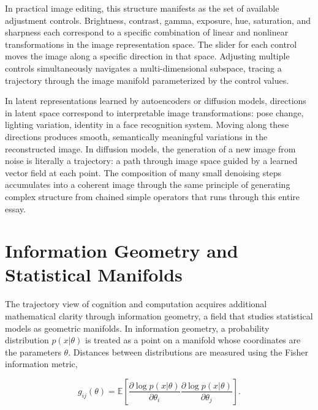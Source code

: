 \documentclass[11pt, a4paper]{article}
\theoremstyle{plain}
\theoremstyle{definition}
\theoremstyle{remark}
\begin{document}
In practical image editing, this structure manifests as the set of available adjustment
controls. Brightness, contrast, gamma, exposure, hue, saturation, and sharpness each
correspond to a specific combination of linear and nonlinear transformations in the image
representation space. The slider for each control moves the image along a specific
direction in that space. Adjusting multiple controls simultaneously navigates a
multi-dimensional subspace, tracing a trajectory through the image manifold parameterized
by the control values.

In latent representations learned by autoencoders or diffusion models, directions in
latent space correspond to interpretable image transformations: pose change, lighting
variation, identity in a face recognition system. Moving along these directions produces
smooth, semantically meaningful variations in the reconstructed image. In diffusion
models, the generation of a new image from noise is literally a trajectory: a path
through image space guided by a learned vector field at each point. The composition of
many small denoising steps accumulates into a coherent image through the same principle
of generating complex structure from chained simple operators that runs through this
entire essay.


\section{Information Geometry and Statistical Manifolds}

The trajectory view of cognition and computation acquires additional mathematical
clarity through information geometry, a field that studies statistical models as
geometric manifolds. In information geometry, a probability distribution $p(x|\theta)$
is treated as a point on a manifold whose coordinates are the parameters $\theta$.
Distances between distributions are measured using the Fisher information metric,

\begin{equation}
g_{ij}(\theta) =
\mathbb{E}\left[
\frac{\partial \log p(x|\theta)}{\partial \theta_i}
\frac{\partial \log p(x|\theta)}{\partial \theta_j}
\right].
\label{eq:fisher}
\end{equation}
\end{document}
